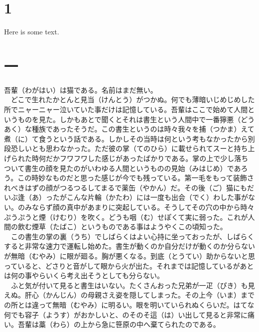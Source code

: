 \documentclass{book}
\begin{document}
\chapter*{1}
Here is some text.
\blindtext

\blindtext

\chapter*{一}
吾輩（わがはい）は猫である。名前はまだ無い。\\
　どこで生れたかとんと見当（けんとう）がつかぬ。何でも薄暗いじめじめした所でニャーニャー泣いていた事だけは記憶している。吾輩はここで始めて人間というものを見た。しかもあとで聞くとそれは書生という人間中で一番獰悪（どうあく）な種族であったそうだ。この書生というのは時々我々を捕（つかま）えて煮（に）て食うという話である。しかしその当時は何という考もなかったから別段恐しいとも思わなかった。ただ彼の掌（てのひら）に載せられてスーと持ち上げられた時何だかフワフワした感じがあったばかりである。掌の上で少し落ちついて書生の顔を見たのがいわゆる人間というものの見始（みはじめ）であろう。この時妙なものだと思った感じが今でも残っている。第一毛をもって装飾されべきはずの顔がつるつるしてまるで薬缶（やかん）だ。その後（ご）猫にもだいぶ逢（あ）ったがこんな片輪（かたわ）には一度も出会（でく）わした事がない。のみならず顔の真中があまりに突起している。そうしてその穴の中から時々ぷうぷうと煙（けむり）を吹く。どうも咽（む）せぽくて実に弱った。これが人間の飲む煙草（たばこ）というものである事はようやくこの頃知った。\\
　この書生の掌の裏（うち）でしばらくはよい心持に坐っておったが、しばらくすると非常な速力で運転し始めた。書生が動くのか自分だけが動くのか分らないが無暗（むやみ）に眼が廻る。胸が悪くなる。到底（とうてい）助からないと思っていると、どさりと音がして眼から火が出た。それまでは記憶しているがあとは何の事やらいくら考え出そうとしても分らない。\\
　ふと気が付いて見ると書生はいない。たくさんおった兄弟が一疋（ぴき）も見えぬ。肝心（かんじん）の母親さえ姿を隠してしまった。その上今（いま）までの所とは違って無暗（むやみ）に明るい。眼を明いていられぬくらいだ。はてな何でも容子（ようす）がおかしいと、のそのそ這（は）い出して見ると非常に痛い。吾輩は藁（わら）の上から急に笹原の中へ棄てられたのである。\\
\end{document}
